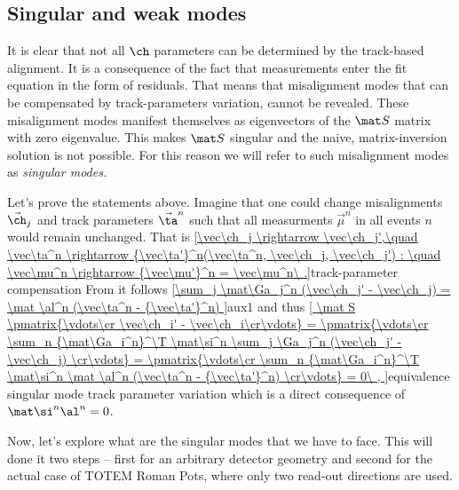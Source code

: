 \subsection[al sing modes]{Singular and weak modes}

It is clear that not all $\ch$ parameters can be determined by the track-based alignment. It is a consequence of the fact that measurements enter the fit equation  in the form of residuals. That means that misalignment modes that can be compensated by track-parameters variation, cannot be revealed. These misalignment modes manifest themselves as eigenvectors of the $\mat S$ matrix with zero eigenvalue. This makes $\mat S$ singular and the naive, matrix-inversion solution  is not possible. For this reason we will refer to such misalignment modes as \em{singular modes}.



Let's prove the statements above. Imagine that one could change misalignments $\vec\ch_j$ and track parameters $\vec\ta^n$ such that all measurments $\vec\mu^n$ in all events $n$ would remain unchanged. That is
\eqref{\vec\ch_j \rightarrow \vec\ch_j',\quad \vec\ta^n \rightarrow {\vec\ta'}^n(\vec\ta^n, \vec\ch_j, \vec\ch_j') : \quad \vec\mu^n \rightarrow {\vec\mu'}^n = \vec\mu^n\ .}{track-parameter compensation}
From  it follows
\eqref{\sum_j \mat\Ga_j^n (\vec\ch_j' - \vec\ch_j) = \mat \al^n (\vec\ta^n - {\vec\ta'}^n) }{aux1}
and thus
\eqref{
\mat S \pmatrix{\vdots\cr \vec\ch_i' - \vec\ch_i\cr\vdots} = 
\pmatrix{\vdots\cr \sum_n {\mat\Ga_i^n}^\T \mat\si^n \sum_j \Ga_j^n (\vec\ch_j' - \vec\ch_j) \cr\vdots} =
\pmatrix{\vdots\cr \sum_n {\mat\Ga_i^n}^\T \mat\si^n \mat \al^n (\vec\ta^n - {\vec\ta'}^n) \cr\vdots} = 0\ ,
}{equivalence singular mode track parameter variation}
which is a direct consequence of $\mat\si^n \al^n = 0$.

Now, let's explore what are the singular modes that we have to face. This will done it two steps -- first for an arbitrary detector geometry and second for the actual case of TOTEM Roman Pots, where only two read-out directions are used.



